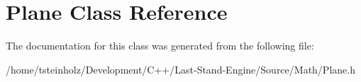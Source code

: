 \hypertarget{classPlane}{}\section{Plane Class Reference}
\label{classPlane}


The documentation for this class was generated from the following file\+:\begin{DoxyCompactItemize}
\item 
/home/tsteinholz/\+Development/\+C++/\+Last-\/\+Stand-\/\+Engine/\+Source/\+Math/Plane.\+h\end{DoxyCompactItemize}
